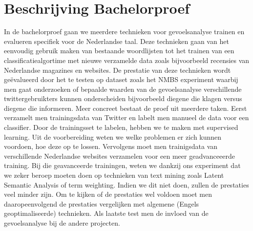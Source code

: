 \chapter{Beschrijving Bachelorproef}\label{Beschrijving Bachelorproef}

In de bachelorproef gaan we meerdere technieken voor gevoelsanalyse trainen en evalueren specifiek voor de Nederlandse taal. Deze technieken gaan van het eenvoudig gebruik maken van bestaande woordlijsten tot het trainen van een classificatiealgortime met nieuwe verzamelde data zoals bijvoorbeeld recensies van Nederlandse magazines en websites. De prestatie van deze technieken wordt ge\"evalueerd door het te testen op dataset zoals het NMBS experiment waarbij men gaat onderzoeken of bepaalde waarden van de gevoelsanalyse verschillende twittergebruikters kunnen onderscheiden bijvoorbeeld diegene die klagen versus diegene die informeren. Meer concreet bestaat de proef uit meerdere taken. Eerst verzamelt men trainingsdata van Twitter en labelt men manueel de data voor een classifier. Door de trainingsset te labelen, hebben we te maken met supervised learning. Uit de voorbereiding weten we welke problemen er zich kunnen voordoen, hoe deze op te lossen. Vervolgens moet men trainigsdata van verschillende Nederlandse websites verzamelen voor een meer geadvanceeerde training. Bij die geavanceerde trainingen, weten we dankzij ons experiment dat we zeker beroep moeten doen op technieken van text mining zoals Latent Semantic Analysis of term weighting. Indien we dit niet doen, zullen de prestaties veel minder zijn. Om te kijken of de prestaties wel voldoen moet men daaropeenvolgend de prestaties vergelijken met algemene (Engels geoptimaliseerde) technieken. Als laatste test men de invloed van de gevoelsanalyse bij de andere projecten. 
    
